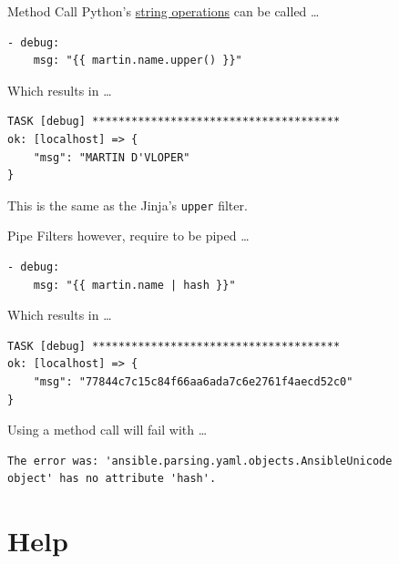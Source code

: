 \documentclass[pdf]{beamer}
\begin{document}
\begin{frame}[t,fragile]{Method Call}
  Python's \href{https://docs.python.org/2/library/string.html}{string
  operations} can be called \ldots
  \pause
  \begin{lstlisting}
- debug:
    msg: "{{ martin.name.upper() }}"
  \end{lstlisting}
  \pause
  Which results in \ldots
  \begin{lstlisting}
TASK [debug] **************************************
ok: [localhost] => {
    "msg": "MARTIN D'VLOPER"
}
  \end{lstlisting}
  This is the same as the Jinja's \texttt{upper} filter.
\end{frame}

\begin{frame}[t,fragile]{Pipe}
  Filters however, require to be piped \ldots
  \pause
  \begin{lstlisting}
- debug:
    msg: "{{ martin.name | hash }}"
  \end{lstlisting}
  \pause
  Which results in \ldots
  \begin{lstlisting}
TASK [debug] **************************************
ok: [localhost] => {
    "msg": "77844c7c15c84f66aa6ada7c6e2761f4aecd52c0"
}
  \end{lstlisting}
  \pause
  Using a method call will fail with \ldots
  \begin{lstlisting}[basicstyle=\scriptsize\color{red}\ttfamily]
The error was: 'ansible.parsing.yaml.objects.AnsibleUnicode
object' has no attribute 'hash'.
  \end{lstlisting}
\end{frame}

\section{Help}

\end{document}
